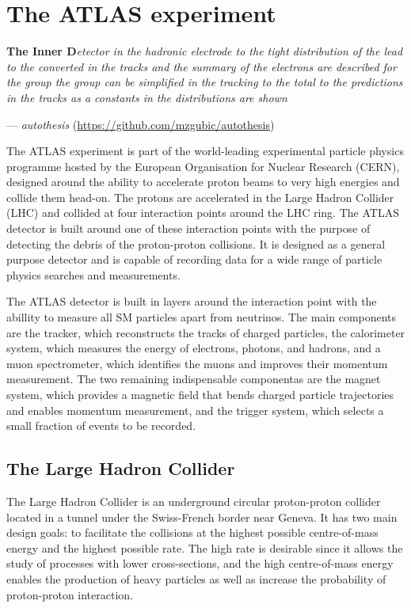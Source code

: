 \chapter{The ATLAS experiment}

\textbf{The Inner D}\textit{etector in the hadronic electrode to the tight distribution of the lead to the converted in the tracks and the summary of the electrons are described for the group the group can be simplified in the tracking to the total to the predictions in the tracks as a constants in the distributions are shown}
\vspace{5mm}
\begin{flushright}
--- \textit{autothesis} (\url{https://github.com/mzgubic/autothesis})
\end{flushright}

\thispagestyle{empty}
\newpage

\noindent
The ATLAS experiment is part of the world-leading experimental particle
physics programme hosted by the European Organisation for Nuclear Research
(CERN), designed around the ability to accelerate proton beams to very high
energies and collide them head-on. The protons are accelerated in the Large
Hadron Collider (LHC) and collided at four interaction points
around the LHC ring. The ATLAS detector is built around one of these
interaction points with the purpose of detecting the debris of the
proton-proton collisions. It is designed as a general purpose detector
and is capable of recording data for a wide range of particle physics
searches and measurements.

The ATLAS detector is built in layers around the interaction point with
the abillity to measure all SM particles apart from neutrinos. The main
components are the tracker, which reconstructs the tracks of charged 
particles, the calorimeter system, which measures the energy of
electrons, photons, and hadrons, and a muon spectrometer, which identifies
the muons and improves their momentum measurement. The two remaining 
indispensable componentas are the magnet system, which provides a 
magnetic field that bends charged particle trajectories and enables 
momentum measurement, and the trigger system, which selects a small
fraction of events to be recorded.

\section{The Large Hadron Collider}

The Large Hadron Collider is an underground circular proton-proton collider
located in a tunnel under the Swiss-French border near Geneva. It has two
main design goals: to facilitate the collisions at the highest possible
centre-of-mass energy and the highest possible rate. The high rate is
desirable since it allows the study of processes with lower cross-sections, and
the high centre-of-mass energy enables the production of heavy particles as
well as increase the probability of proton-proton interaction.

